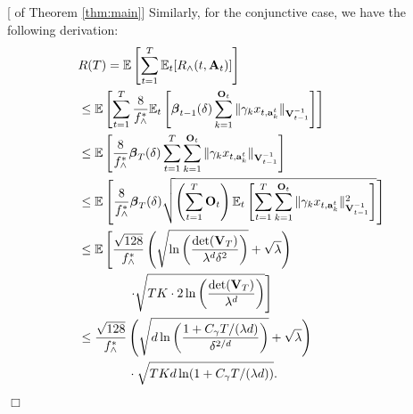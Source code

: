 \documentclass{article}
\newcommand{\bbeta}{\boldsymbol{\beta}}
\newcommand{\EE}{\mathbb{E}}
\newcommand{\bA}{\mathbf{A}}
\newcommand{\ba}{\mathbf{a}}
\newcommand{\bO}{\mathbf{O}}
\newcommand{\bV}{\mathbf{V}}
\newcommand{\norm}[1]{\| #1 \|}
\newenvironment{proof}{\noindent {\textbf{Proof. }}}{$\Box$ \medskip}
\begin{document}
\begin{proof}[ of Theorem \ref{thm:main}]
	Similarly, for the conjunctive case, we have the following derivation:
	\begin{align}
	&R(T) = \EE \left[ \sum_{t=1}^{T} \EE_{t}[R_{\wedge}(t, \bA_t)] \right] \notag\\
	&\leq \EE \left[\sum_{t=1}^{T} \frac{8}{f_{\wedge}^{\ast}} \EE_t\left[\bbeta_{t-1}(\delta)\sum_{k=1}^{\bO_t}\norm{\gamma_k x_{t,\ba_k^t}}_{\bV_{t-1}^{-1}} \right] \right] \label{eq:pfMCdeltaEst}\\
	&\leq \EE\left[\frac{8}{f_{\wedge}^{\ast}} \bbeta_{T}(\delta) \sum_{t=1}^{T} \sum_{k=1}^{\bO_t}\norm{\gamma_k x_{t,\ba_k^t}}_{\bV_{t-1}^{-1}} \right] \label{eq:pfMCbeta}\\
	&\leq \EE\left[\frac{8}{f_{\wedge}^{\ast}} \bbeta_{T}(\delta) \sqrt{ \left(\sum_{t=1}^{T} \bO_t \right) \EE_t \left[\sum_{t=1}^{T} \sum_{k=1}^{\bO_t}\norm{\gamma_k x_{t,\ba_k^t}}_{\bV_{t-1}^{-1}}^2 \right]} \right] \label{eq:pfMCmeaneq}\\
	&\leq \EE \left[\frac{\sqrt{128}}{f_{\wedge}^{\ast}} \left(\sqrt{\ln\left(\frac{\det(\bV_T)}{\lambda^d \delta^2}\right) } + \sqrt{\lambda} \right) \right. \notag\\
	&\qquad \qquad \left. \cdot \sqrt{TK \cdot 2\ln \left(\frac{\det(\bV_T)}{\lambda^d} \right)} \right] \label{eq:pfMCsumXi}\\
	&\leq \frac{\sqrt{128}}{f_{\wedge}^{\ast}} \left(\sqrt{d \ln \left( \frac{1 + C_\gamma T/(\lambda d)}{\delta^{2/d}}\right) } + \sqrt{\lambda} \right) \notag\\
	&\qquad \qquad \cdot \sqrt{TKd\ln(1 + C_\gamma T/(\lambda d))}. \label{eq:pfMCdetEst}
	\end{align}
\end{proof}

	
\end{document}
